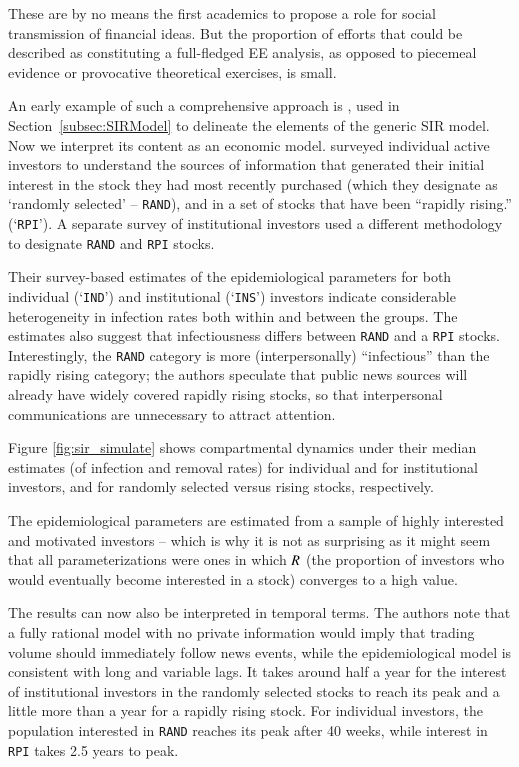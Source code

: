 These are by no means the first academics to propose a role for social transmission of financial ideas.  But the proportion of efforts that could be described as constituting a full-fledged EE analysis, as opposed to piecemeal evidence or provocative theoretical exercises, is small. %

An early example of such a comprehensive approach is  \cite{shiller1989survey}, used in Section~\ref{subsec:SIRModel} to delineate the elements of the generic SIR model.  Now we interpret its content as an economic model.  \cite{shiller1989survey} surveyed individual active investors to understand the sources of information that generated their initial interest in the stock they had most recently purchased (which they designate as `randomly selected' -- \texttt{RAND}), and in a set of stocks that have been ``rapidly rising.'' (`\texttt{RPI}').  A separate survey of institutional investors used a different methodology to designate \texttt{RAND} and \texttt{RPI} stocks. %

Their survey-based estimates of the epidemiological parameters for both individual (`\texttt{IND}') and institutional (`\texttt{INS}') investors indicate considerable heterogeneity in infection rates both within and between the groups. The estimates also suggest that infectiousness differs between \texttt{RAND} and a \texttt{RPI} stocks. Interestingly, the \texttt{RAND} category is more (interpersonally) ``infectious'' than the rapidly rising category; the authors speculate that public news sources will already have widely covered rapidly rising stocks, so that interpersonal communications are unnecessary to attract attention.

Figure \ref{fig:sir_simulate} shows compartmental dynamics under their median estimates (of infection and removal rates) for individual and for institutional investors, and for randomly selected versus rising stocks, respectively.

The epidemiological parameters are estimated from a sample of highly interested and motivated investors -- which is why it is not as surprising as it might seem that all parameterizations were ones in which $R$ (the proportion of investors who would eventually become interested in a stock) converges to a high value.

The results can now also be interpreted in temporal terms.  The authors note that a fully rational model with no private information would imply that trading volume should immediately follow news events, while the epidemiological model is consistent with long and variable lags.  It takes around half a year for the interest of institutional investors in the randomly selected stocks to reach its peak and a little more than a year for a rapidly rising stock. For individual investors, the population interested in \texttt{RAND} reaches its peak after 40 weeks, while interest in \texttt{RPI} takes 2.5 years to peak.

